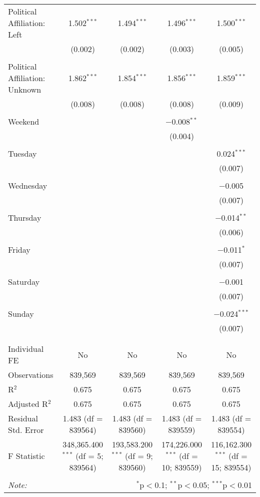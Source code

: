 \documentclass[
]{article}
\begin{document}
\begin{table}[!htbp]
{\begin{tabular}{@{\extracolsep{5pt}}lcccc}
 Political Affiliation: Left & 1.502$^{***}$ & 1.494$^{***}$ & 1.496$^{***}$ & 1.500$^{***}$ \\ 
  & (0.002) & (0.002) & (0.003) & (0.005) \\ 
  & & & & \\ 
 Political Affiliation: Unknown & 1.862$^{***}$ & 1.854$^{***}$ & 1.856$^{***}$ & 1.859$^{***}$ \\ 
  & (0.008) & (0.008) & (0.008) & (0.009) \\ 
  & & & & \\ 
 Weekend &  &  & $-$0.008$^{**}$ &  \\ 
  &  &  & (0.004) &  \\ 
  & & & & \\ 
 Tuesday &  &  &  & 0.024$^{***}$ \\ 
  &  &  &  & (0.007) \\ 
  & & & & \\ 
 Wednesday &  &  &  & $-$0.005 \\ 
  &  &  &  & (0.007) \\ 
  & & & & \\ 
 Thursday &  &  &  & $-$0.014$^{**}$ \\ 
  &  &  &  & (0.006) \\ 
  & & & & \\ 
 Friday &  &  &  & $-$0.011$^{*}$ \\ 
  &  &  &  & (0.007) \\ 
  & & & & \\ 
 Saturday &  &  &  & $-$0.001 \\ 
  &  &  &  & (0.007) \\ 
  & & & & \\ 
 Sunday &  &  &  & $-$0.024$^{***}$ \\ 
  &  &  &  & (0.007) \\ 
  & & & & \\ 
\hline \\[-1.8ex] 
Individual FE & No & No & No & No \\ 
Observations & 839,569 & 839,569 & 839,569 & 839,569 \\ 
R$^{2}$ & 0.675 & 0.675 & 0.675 & 0.675 \\ 
Adjusted R$^{2}$ & 0.675 & 0.675 & 0.675 & 0.675 \\ 
Residual Std. Error & 1.483 (df = 839564) & 1.483 (df = 839560) & 1.483 (df = 839559) & 1.483 (df = 839554) \\ 
F Statistic & 348,365.400$^{***}$ (df = 5; 839564) & 193,583.200$^{***}$ (df = 9; 839560) & 174,226.000$^{***}$ (df = 10; 839559) & 116,162.300$^{***}$ (df = 15; 839554) \\ 
\hline 
\hline \\[-1.8ex] 
\textit{Note:}  & \multicolumn{4}{r}{$^{*}$p$<$0.1; $^{**}$p$<$0.05; $^{***}$p$<$0.01} \\ 
\end{tabular}
} 
\end{table} 
\newpage
\end{document}
